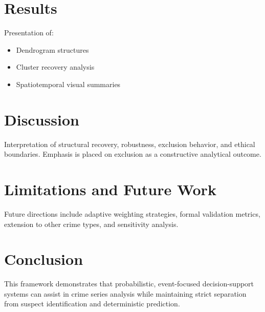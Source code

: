 \documentclass[12pt]{article}
\begin{document}
\section{Results}
Presentation of:
\begin{itemize}
    \item Dendrogram structures
    \item Cluster recovery analysis
    \item Spatiotemporal visual summaries
\end{itemize}

\section{Discussion}
Interpretation of structural recovery, robustness, exclusion behavior, and ethical boundaries. Emphasis is placed on exclusion as a constructive analytical outcome.

\section{Limitations and Future Work}
Future directions include adaptive weighting strategies, formal validation metrics, extension to other crime types, and sensitivity analysis.

\section{Conclusion}
This framework demonstrates that probabilistic, event-focused decision-support systems can assist in crime series analysis while maintaining strict separation from suspect identification and deterministic prediction.



\end{document}
